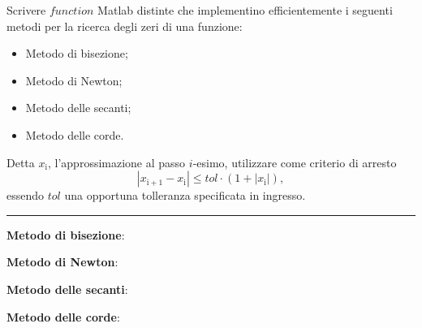 Scrivere $function$ Matlab distinte che implementino efficientemente
i seguenti metodi per la ricerca degli zeri di una funzione:
\begin{itemize}
	\item Metodo di bisezione;
	\item Metodo di Newton;
	\item Metodo delle secanti;
	\item Metodo delle corde.
\end{itemize}
Detta $x_\mathrm{i}$, l'approssimazione al passo $i$-esimo, utilizzare come criterio di arresto
$$|x_\mathrm{i+1} - x_\mathrm{i}| \leq tol\cdot(1+|x_\mathrm{i}|),$$
essendo $tol$ una opportuna tolleranza specificata in ingresso.

\hspace*{\fill}
\par\noindent\rule{\textwidth}{0.4pt}
\hspace*{\fill}

\textbf{Metodo di bisezione}:

\textbf{Metodo di Newton}:

\begin{minipage}{\textwidth}
	\textbf{Metodo delle secanti}:
	
\end{minipage}
\begin{minipage}{\textwidth}
	\textbf{Metodo delle corde}:
	
\end{minipage}
